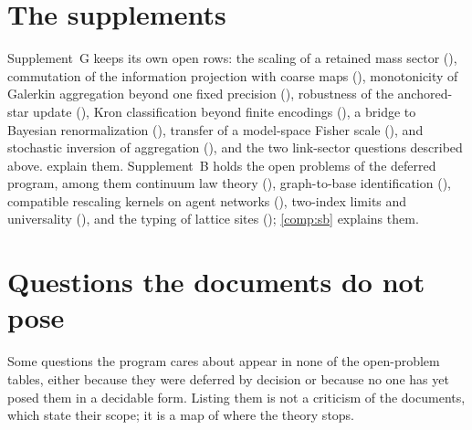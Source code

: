 \section*{The supplements}

Supplement~G keeps its own open rows: the scaling of a retained mass sector
(), commutation of the information projection with coarse maps
(), monotonicity of Galerkin aggregation beyond one fixed precision
(), robustness of the anchored-star update
(), Kron classification beyond finite encodings
(), a bridge to Bayesian renormalization
(), transfer of a model-space Fisher scale
(), and stochastic inversion of aggregation
(), and the two link-sector questions described above.
 explain them. Supplement~B holds the
open problems of the deferred program, among them continuum law theory
(), graph-to-base identification
(), compatible rescaling kernels on agent networks
(), two-index limits and universality
(), and the typing of lattice sites ();
\cref{comp:sb} explains them.

\section*{Questions the documents do not pose}

Some questions the program cares about appear in none of the open-problem tables, either because
they were deferred by decision or because no one has yet posed them in a decidable form. Listing them
is not a criticism of the documents, which state their scope; it is a map of where the theory stops.

